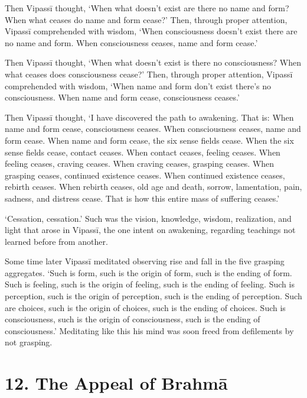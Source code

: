 \documentclass[12pt,openany]{book}%
\begin{document}
Then \textsanskrit{Vipassī} thought, ‘When what doesn’t exist are there no name and form? When what ceases do name and form cease?’ Then, through proper attention, \textsanskrit{Vipassī} comprehended with wisdom, ‘When consciousness doesn’t exist there are no name and form. When consciousness ceases, name and form cease.’ 

Then \textsanskrit{Vipassī} thought, ‘When what doesn’t exist is there no consciousness? When what ceases does consciousness cease?’ Then, through proper attention, \textsanskrit{Vipassī} comprehended with wisdom, ‘When name and form don’t exist there’s no consciousness. When name and form cease, consciousness ceases.’ 

Then \textsanskrit{Vipassī} thought, ‘I have discovered the path to awakening. That is: When name and form cease, consciousness ceases. When consciousness ceases, name and form cease. When name and form cease, the six sense fields cease. When the six sense fields cease, contact ceases. When contact ceases, feeling ceases. When feeling ceases, craving ceases. When craving ceases, grasping ceases. When grasping ceases, continued existence ceases. When continued existence ceases, rebirth ceases. When rebirth ceases, old age and death, sorrow, lamentation, pain, sadness, and distress cease. That is how this entire mass of suffering ceases.’ 

‘Cessation, cessation.’ Such was the vision, knowledge, wisdom, realization, and light that arose in \textsanskrit{Vipassī}, the one intent on awakening, regarding teachings not learned before from another. 

Some time later \textsanskrit{Vipassī} meditated observing rise and fall in the five grasping aggregates. ‘Such is form, such is the origin of form, such is the ending of form. Such is feeling, such is the origin of feeling, such is the ending of feeling. Such is perception, such is the origin of perception, such is the ending of perception. Such are choices, such is the origin of choices, such is the ending of choices. Such is consciousness, such is the origin of consciousness, such is the ending of consciousness.’ Meditating like this his mind was soon freed from defilements by not grasping. 

\section*{12. The Appeal of \textsanskrit{Brahmā} }
\end{document}
